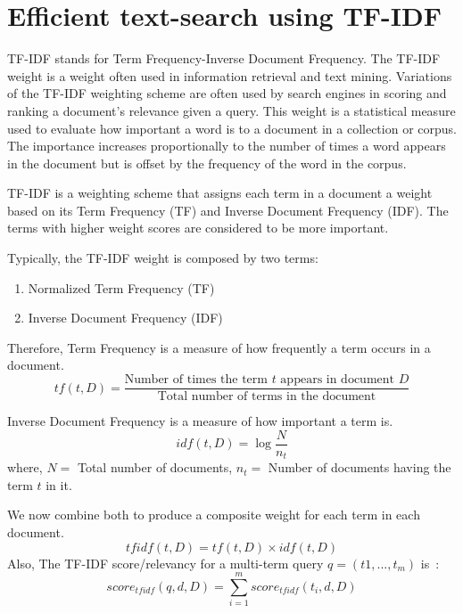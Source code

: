 \section{Efficient text-search using TF-IDF}

TF-IDF stands for Term Frequency-Inverse Document Frequency. 
The TF-IDF weight is a weight often used in information 
retrieval and text mining. Variations of the TF-IDF weighting 
scheme are often used by search engines in scoring and ranking 
a document’s relevance given a query. 
This weight is a statistical measure used to evaluate how 
important a word is to a document in a collection or corpus. 
The importance increases proportionally to the number of times 
a word appears in the document but is offset by the frequency 
of the word in the corpus.

TF-IDF is a weighting scheme that assigns each term in a 
document a weight based on its Term Frequency (TF) and 
Inverse Document Frequency (IDF). The terms with higher 
weight scores are considered to be more important.

Typically, the TF-IDF weight is composed by two terms:
\begin{enumerate}
    \item Normalized Term Frequency (TF)
    \item Inverse Document Frequency (IDF)
\end{enumerate}

Therefore, Term Frequency is a measure of how frequently a 
term occurs in a document.
\begin{equation}
    tf(t, D) = \frac{\text{Number of times the term } t \text{ appears in document } D}{\text{Total number of terms in the document}}
    \label{eqn:tf}
\end{equation}

Inverse Document Frequency is a measure of how important a term is.~\cite{tfidftutorial}
\begin{equation}
    idf(t, D) = \log \frac{N}{n _t}
    \label{eqn:idf}
\end{equation}
where, $N =$ Total number of documents, $n _t =$ Number of documents having the term $t$ in it.

We now combine both to produce a composite weight for each term in each document.
\begin{equation}
    tfidf(t,D) = tf(t,D) \times idf(t,D)
    \label{eqn:tfidf}
\end{equation}
Also, The TF-IDF score/relevancy for a multi-term query $q = (t 1 , . . . , t_m)$ is~\cite{tfidfFormulae}:
\begin{equation}
    score _{tfidf}(q, d, D) = \sum^{m}_{i = 1} score _{tfidf}(t _i, d, D)
    \label{eqn:score}
\end{equation}

